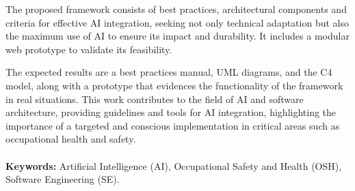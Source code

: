The proposed framework consists of best practices, architectural components and criteria for effective AI integration, seeking not only technical adaptation but also the maximum use of AI to ensure its impact and durability. It includes a modular web prototype to validate its feasibility.

The expected results are a best practices manual, UML diagrams, and the C4 model, along with a prototype that evidences the functionality of the framework in real situations. This work contributes to the field of AI and software architecture, providing guidelines and tools for AI integration, highlighting the importance of a targeted and conscious implementation in critical areas such as occupational health and safety.

\paragraph*{}{\textbf{Keywords:}}
Artificial Intelligence (AI), Occupational Safety and Health (OSH), Software Engineering (SE).